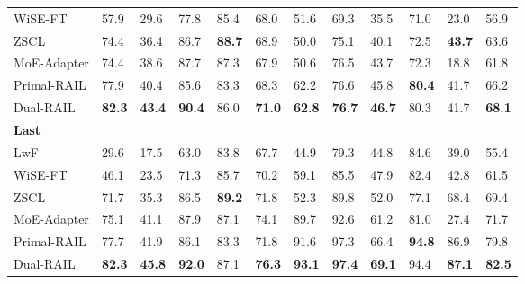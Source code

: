 \begin{table}
\begin{tabular}{b{8em}b{1.6em}b{1.6em}b{1.6em}b{1.6em}b{1.6em}b{1.6em}b{1.6em}b{1.6em}b{1.6em}b{1.6em}>{\centering\arraybackslash}m{3em}}
          \quad WiSE-FT & 57.9 & 29.6 & 77.8 & 85.4 & 68.0 & 51.6 & 69.3 & 35.5 & 71.0 & 23.0 & {\cellcolor{lightgrey}}56.9\\
          \quad ZSCL & 74.4 & 36.4 & 86.7 & \textbf{88.7} & 68.9 & 50.0 & 75.1 & 40.1 & 72.5 & \textbf{43.7} & {\cellcolor{lightgrey}}63.6\\
          \quad MoE-Adapter & 74.4 & 38.6 & 87.7 & 87.3 & 67.9 & 50.6 & 76.5 & 43.7 & 72.3 & 18.8& {\cellcolor{lightgrey}}61.8\\
          \quad Primal-RAIL & 77.9 & 40.4 & 85.6 & 83.3 & 68.3 & 62.2 & 76.6 & 45.8 & \textbf{80.4} & 41.7 & {\cellcolor{lightgrey}}66.2\\
          \quad Dual-RAIL & \textbf{82.3} & \textbf{43.4} & \textbf{90.4} & 86.0 & \textbf{71.0} & \textbf{62.8} & \textbf{76.7} & \textbf{46.7} & 80.3& 41.7 & {\cellcolor{lightgrey}}\textbf{68.1}\\
    \midrule
        \multicolumn{11}{l}{\textbf{Last}}\\ 
          \quad LwF& 29.6 & 17.5 & 63.0 & 83.8 & 67.7 & 44.9 & 79.3 & 44.8 & 84.6 & 39.0 & {\cellcolor{lightgrey}}55.4\\ 
          \quad WiSE-FT & 46.1 & 23.5 & 71.3 & 85.7 & 70.2 & 59.1 & 85.5 & 47.9 & 82.4 & 42.8 & {\cellcolor{lightgrey}}61.5\\ 
          \quad ZSCL & 71.7 & 35.3 & 86.5 & \textbf{89.2} & 71.8 & 52.3 & 89.8 & 52.0 & 77.1 & 68.4 & {\cellcolor{lightgrey}}69.4\\ 
          \quad MoE-Adapter & 75.1 & 41.1 & 87.9 & 87.1 & 74.1 & 89.7 & 92.6 & 61.2 & 81.0 & 27.4& {\cellcolor{lightgrey}}71.7\\ 
          \quad Primal-RAIL & 77.7 & 41.9 & 86.1 & 83.3 & 71.8 & 91.6 & 97.3 & 66.4 & \textbf{94.8} & 86.9 & {\cellcolor{lightgrey}}79.8\\ 
          \quad Dual-RAIL & \textbf{82.3} & \textbf{45.8} & \textbf{92.0} & 87.1 & \textbf{76.3} & \textbf{93.1} & \textbf{97.4} & \textbf{69.1} & 94.4 & \textbf{87.1} & {\cellcolor{lightgrey}}\textbf{82.5}\\
    \bottomrule
    \end{tabular}
\end{table}

